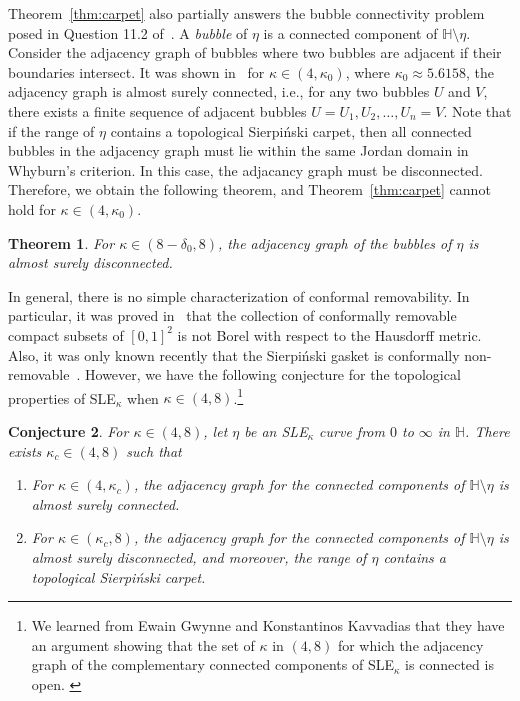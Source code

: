 \documentclass[a4paper]{article}
\numberwithin{equation}{section}
\newtheorem{theorem}{Theorem}[section]
\newtheorem{conjecture}[theorem]{Conjecture}
\numberwithin{equation}{section}
\renewcommand{\1}{\mathbf{1}}
\begin{document}
Theorem~\ref{thm:carpet} also partially answers the bubble connectivity problem posed in Question 11.2 of~\cite{DMS21-LQG-MRT}. A \textit{bubble} of $\eta$ is a connected component of $\mathbb{H} \setminus \eta$. Consider the adjacency graph of bubbles where two bubbles are adjacent if their boundaries intersect. It was shown in~\cite{GP20-connectivity} for $\kappa \in (4, \kappa_0)$, where $\kappa_0 \approx 5.6158$, the adjacency graph is almost surely connected, i.e., for any two bubbles $U$ and $V$, there exists a finite sequence of adjacent bubbles $U = U_1, U_2, \ldots, U_n = V$. Note that if the range of $\eta$ contains a topological Sierpi\'nski carpet, then all connected bubbles in the adjacency graph must lie within the same Jordan domain in Whyburn's criterion. In this case, the adjacancy graph must be disconnected. Therefore, we obtain the following theorem, and Theorem~\ref{thm:carpet} cannot hold for $\kappa \in (4,\kappa_0)$.

\begin{theorem}\label{thm:disconnect}
    For $\kappa \in (8 - \delta_0,8)$, the adjacency graph of the bubbles of $\eta$ is almost surely disconnected.
\end{theorem}

In general, there is no simple characterization of conformal removability. In particular, it was proved in~\cite{bishop2020conformal} that the collection of conformally removable compact subsets of $[0,1]^2$ is not Borel with respect to the Hausdorff metric. Also, it was only known recently that the Sierpi\'nski gasket is conformally non-removable~\cite{Ntalampekos-gasket}. However, we have the following conjecture for the topological properties of SLE$_\kappa$ when $\kappa \in (4,8)$.\footnote{We learned from Ewain Gwynne and Konstantinos Kavvadias that they have an argument showing that the set of $\kappa$ in $(4,8)$ for which the adjacency graph of the complementary connected components  of SLE$_\kappa$ is connected is open. \label{footnote:gk-open}}

\begin{conjecture}\label{conj:removability}
    For $\kappa \in (4,8)$, let $\eta$ be an SLE$_\kappa$ curve from $0$ to $\infty$ in $\mathbb{H}$. There exists $\kappa_c \in (4,8)$ such that
    \begin{enumerate}[(1)]
        \item \label{conj:case1} For $\kappa \in (4, \kappa_c)$, the adjacency graph for the connected components of $\mathbb{H} \setminus \eta$ is almost surely connected.

        \item \label{conj:case2} For $\kappa \in (\kappa_c,8)$, the adjacency graph for the connected components of $\mathbb{H} \setminus \eta$ is almost surely disconnected, and moreover, the range of $\eta$ contains a topological Sierpi\'nski carpet. 
            
    \end{enumerate}
\end{conjecture}
\end{document}
